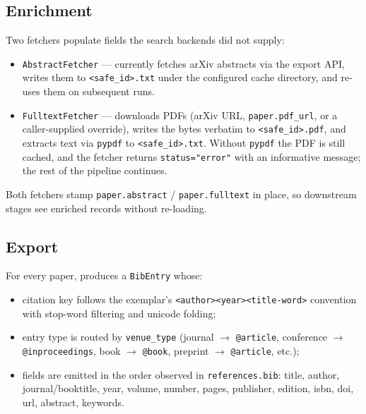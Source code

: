 \documentclass[
  english,
]{article}
\providecommand{\tightlist}{%
  \setlength{\itemsep}{0pt}\setlength{\parskip}{0pt}}
\begin{document}
\subsection{Enrichment}\label{enrichment}

Two fetchers populate fields the search backends did not supply:

\begin{itemize}
\tightlist
\item
  \texttt{AbstractFetcher} --- currently fetches arXiv abstracts via the
  export API, writes them to
  \texttt{\textless{}safe\_id\textgreater{}.txt} under the configured
  cache directory, and re-uses them on subsequent runs.
\item
  \texttt{FulltextFetcher} --- downloads PDFs (arXiv URL,
  \texttt{paper.pdf\_url}, or a caller-supplied override), writes the
  bytes verbatim to \texttt{\textless{}safe\_id\textgreater{}.pdf}, and
  extracts text via \texttt{pypdf} to
  \texttt{\textless{}safe\_id\textgreater{}.txt}. Without \texttt{pypdf}
  the PDF is still cached, and the fetcher returns
  \texttt{status="error"} with an informative message; the rest of the
  pipeline continues.
\end{itemize}

Both fetchers stamp \texttt{paper.abstract} / \texttt{paper.fulltext} in
place, so downstream stages see enriched records without re-loading.

\subsection{Export}\label{export}

For every paper,  produces a
\texttt{BibEntry} whose:

\begin{itemize}
\tightlist
\item
  citation key follows the exemplar's
  \texttt{\textless{}author\textgreater{}\textless{}year\textgreater{}\textless{}title-word\textgreater{}}
  convention with stop-word filtering and unicode folding;
\item
  entry type is routed by \texttt{venue\_type} (journal \texorpdfstring{\ensuremath{\to}}{->}
  \texttt{@article}, conference \texorpdfstring{\ensuremath{\to}}{->} \texttt{@inproceedings}, book \texorpdfstring{\ensuremath{\to}}{->}
  \texttt{@book}, preprint \texorpdfstring{\ensuremath{\to}}{->} \texttt{@article}, etc.);
\item
  fields are emitted in the order observed in \texttt{references.bib}:
  title, author, journal/booktitle, year, volume, number, pages,
  publisher, edition, isbn, doi, url, abstract, keywords.
\end{itemize}
\end{document}
